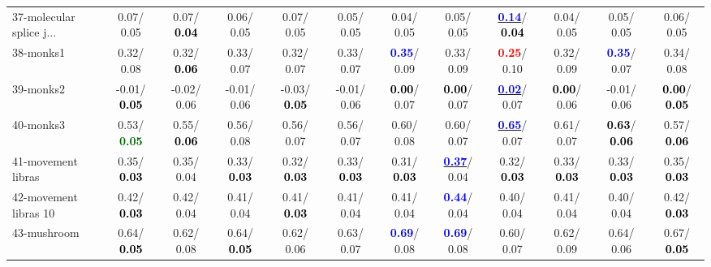 \begin{table}[h]
\begin{center}
{\begin{tabular}{lc|c|c|c|c|c|c|c|c|c|c}
37-molecular splice j... &   0.07/  0.05 &   0.07/\textcolor{black}{\textbf{  0.04}} &   0.06/  0.05 &   0.07/  0.05 &   0.05/  0.05 &   0.04/  0.05 &   0.05/  0.05 & \underline{\textcolor{blue}{\textbf{  0.14}}}/\textcolor{black}{\textbf{  0.04}} &   0.04/  0.05 &   0.05/  0.05 &   0.06/  0.05 \\
38-monks1 &   0.32/  0.08 &   0.32/\textcolor{black}{\textbf{  0.06}} &   0.33/  0.07 &   0.32/  0.07 &   0.33/  0.07 & \textcolor{blue}{\textbf{  0.35}}/  0.09 &   0.33/  0.09 & \textcolor{red}{\textbf{  0.25}}/  0.10 &   0.32/  0.09 & \textcolor{blue}{\textbf{  0.35}}/  0.07 &   0.34/  0.08 \\
39-monks2 &  -0.01/\textcolor{black}{\textbf{  0.05}} &  -0.02/  0.06 &  -0.01/  0.06 &  -0.03/\textcolor{black}{\textbf{  0.05}} &  -0.01/  0.06 & \textcolor{black}{\textbf{  0.00}}/  0.07 & \textcolor{black}{\textbf{  0.00}}/  0.07 & \underline{\textcolor{blue}{\textbf{  0.02}}}/  0.07 & \textcolor{black}{\textbf{  0.00}}/  0.06 &  -0.01/  0.06 & \textcolor{black}{\textbf{  0.00}}/\textcolor{black}{\textbf{  0.05}} \\ \hline
40-monks3 &   0.53/\textcolor{darkgreen}{\textbf{  0.05}} &   0.55/\textcolor{black}{\textbf{  0.06}} &   0.56/  0.08 &   0.56/  0.07 &   0.56/  0.07 &   0.60/  0.08 &   0.60/  0.07 & \underline{\textcolor{blue}{\textbf{  0.65}}}/  0.07 &   0.61/  0.07 & \textcolor{black}{\textbf{  0.63}}/\textcolor{black}{\textbf{  0.06}} &   0.57/\textcolor{black}{\textbf{  0.06}} \\
41-movement libras &   0.35/\textcolor{black}{\textbf{  0.03}} &   0.35/  0.04 &   0.33/\textcolor{black}{\textbf{  0.03}} &   0.32/\textcolor{black}{\textbf{  0.03}} &   0.33/\textcolor{black}{\textbf{  0.03}} &   0.31/\textcolor{black}{\textbf{  0.03}} & \underline{\textcolor{blue}{\textbf{  0.37}}}/  0.04 &   0.32/\textcolor{black}{\textbf{  0.03}} &   0.33/\textcolor{black}{\textbf{  0.03}} &   0.33/\textcolor{black}{\textbf{  0.03}} &   0.35/\textcolor{black}{\textbf{  0.03}} \\
42-movement libras 10 &   0.42/\textcolor{black}{\textbf{  0.03}} &   0.42/  0.04 &   0.41/  0.04 &   0.41/\textcolor{black}{\textbf{  0.03}} &   0.41/  0.04 &   0.41/  0.04 & \textcolor{blue}{\textbf{  0.44}}/  0.04 &   0.40/  0.04 &   0.41/  0.04 &   0.40/  0.04 &   0.42/\textcolor{black}{\textbf{  0.03}} \\
43-mushroom &   0.64/\textcolor{black}{\textbf{  0.05}} &   0.62/  0.08 &   0.64/\textcolor{black}{\textbf{  0.05}} &   0.62/  0.06 &   0.63/  0.07 & \textcolor{blue}{\textbf{  0.69}}/  0.08 & \textcolor{blue}{\textbf{  0.69}}/  0.08 &   0.60/  0.07 &   0.62/  0.09 &   0.64/  0.06 &   0.67/\textcolor{black}{\textbf{  0.05}} \\

\end{tabular}}
\end{center}
\end{table}
